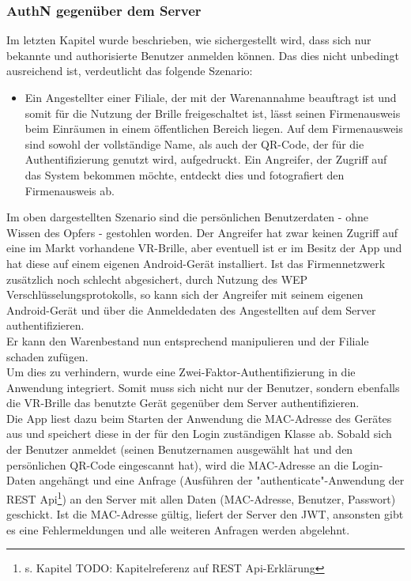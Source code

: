 \subsubsection{\acs{AuthN} gegenüber dem Server}
\label{cha:authn_server}
Im letzten Kapitel wurde beschrieben, wie sichergestellt wird, dass sich nur bekannte und authorisierte Benutzer anmelden können. Das dies nicht unbedingt ausreichend ist, verdeutlicht das folgende Szenario:
\begin{itemize}
	\item Ein Angestellter einer Filiale, der mit der Warenannahme beauftragt ist und somit für die Nutzung der Brille freigeschaltet ist, lässt seinen Firmenausweis beim Einräumen in einem öffentlichen Bereich liegen. Auf dem Firmenausweis sind sowohl der vollständige Name, als auch der QR-Code, der für die Authentifizierung genutzt wird, aufgedruckt. Ein Angreifer, der Zugriff auf das System bekommen möchte, entdeckt dies und fotografiert den Firmenausweis ab.
\end{itemize}
Im oben dargestellten Szenario sind die persönlichen Benutzerdaten - ohne Wissen des Opfers - gestohlen worden. Der Angreifer hat zwar keinen Zugriff auf eine im Markt vorhandene \ac{VR}-Brille, aber eventuell ist er im Besitz der App und hat diese auf einem eigenen Android-Gerät installiert. Ist das Firmennetzwerk zusätzlich noch schlecht abgesichert, \zB durch Nutzung des \ac{WEP} Verschlüsselungsprotokolls, so kann sich der Angreifer mit seinem eigenen Android-Gerät und über die Anmeldedaten des Angestellten auf dem Server authentifizieren.\\
Er kann den Warenbestand nun entsprechend manipulieren und der Filiale schaden zufügen.\\

Um dies zu verhindern, wurde eine Zwei-Faktor-Authentifizierung in die Anwendung integriert. Somit muss sich nicht nur der Benutzer, sondern ebenfalls die \ac{VR}-Brille \bzw das benutzte Gerät gegenüber dem Server authentifizieren.\\

Die App liest dazu beim Starten der Anwendung die \ac{MAC}-Adresse des Gerätes aus und speichert diese in der für den Login zuständigen Klasse ab. Sobald sich der Benutzer anmeldet (seinen Benutzernamen ausgewählt hat und den persönlichen QR-Code eingescannt hat), wird die \ac{MAC}-Adresse an die Login-Daten angehängt und eine Anfrage (Ausführen der "authenticate"-Anwendung der REST Api\footnote{s. Kapitel TODO: Kapitelreferenz auf REST Api-Erklärung}) an den Server mit allen Daten (\ac{MAC}-Adresse, Benutzer, Passwort) geschickt. Ist die \ac{MAC}-Adresse gültig, liefert der Server den \ac{JWT}, ansonsten gibt es eine Fehlermeldungen und alle weiteren Anfragen werden abgelehnt.\\

